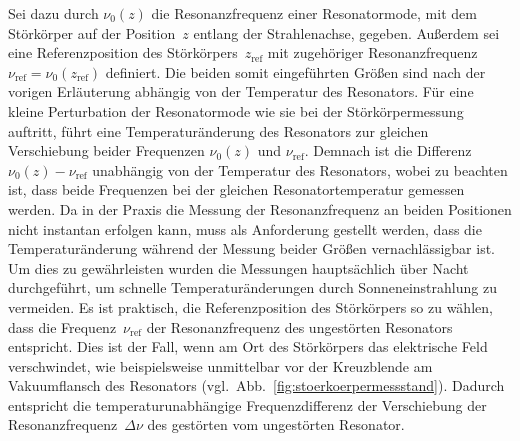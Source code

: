 Sei dazu durch $\nu_0(z)$ die Resonanzfrequenz einer Resonatormode, mit dem Störkörper auf der Position~$z$ entlang der Strahlenachse, gegeben.
Außerdem sei eine Referenzposition des Störkörpers~$z_\mathrm{ref}$ mit zugehöriger Resonanzfrequenz~$\nu_\mathrm{ref} = \nu_0(z_\mathrm{ref})$ definiert.
Die beiden somit eingeführten Größen sind nach der vorigen Erläuterung abhängig von der Temperatur des Resonators.
Für eine kleine Perturbation der Resonatormode wie sie bei der Störkörpermessung auftritt, führt eine Temperaturänderung des Resonators zur gleichen Verschiebung beider Frequenzen $\nu_0(z)$ und $\nu_\mathrm{ref}$.
Demnach ist die Differenz~$\nu_0(z)- \nu_\mathrm{ref}$ unabhängig von der Temperatur des Resonators, wobei zu beachten ist, dass beide Frequenzen bei der gleichen Resonatortemperatur gemessen werden.
Da in der Praxis die Messung der Resonanzfrequenz an beiden Positionen nicht instantan erfolgen kann, muss als Anforderung gestellt werden, dass die Temperaturänderung während der Messung beider Größen vernachlässigbar ist.
Um dies zu gewährleisten wurden die Messungen hauptsächlich über Nacht durchgeführt, um schnelle Temperaturänderungen durch Sonneneinstrahlung zu vermeiden.
Es ist praktisch, die Referenzposition des Störkörpers so zu wählen, dass die Frequenz~$\nu_\mathrm{ref}$ der Resonanzfrequenz des ungestörten Resonators entspricht.
Dies ist der Fall, wenn am Ort des Störkörpers das elektrische Feld verschwindet, wie beispielsweise unmittelbar vor der Kreuzblende am Vakuumflansch des Resonators (vgl.\ Abb.\ \ref{fig:stoerkoerpermessstand}).
Dadurch entspricht die temperaturunabhängige Frequenzdifferenz der Verschiebung der Resonanzfrequenz~$\Delta \nu$ des gestörten vom ungestörten Resonator.



